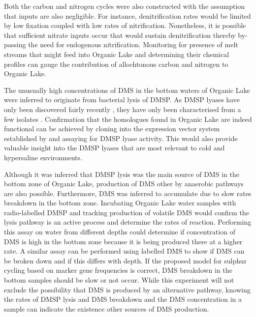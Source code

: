 Both the carbon and nitrogen cycles were also constructed with the assumption that inputs are also negligible.
For instance, denitrification rates would be limited by low fixation coupled with low rates of nitrification.
Nonetheless, it is possible that sufficient nitrate inputs occur that would sustain denitrification thereby by-passing the need for endogenous nitrification.
Monitoring for presence of melt streams that might feed into Organic Lake and determining their chemical profiles can gauge the contribution of allochtonous carbon and nitrogen to Organic Lake.

The unusually high concentrations of \ac{DMS} in the bottom waters of Organic Lake were inferred to originate from bacterial lysis of \ac{DMSP}.
As \ac{DMSP} lyases have only been discovered fairly recently \cite{Todd2007, Curson2008}, they have only been characterised from a few isolates \cite{Todd2007, Curson2008, Curson2010, Todd2010, Curson2012}.
Confirmation that the homologues found in Organic Lake are indeed functional can be achieved by cloning into the expression vector system established by \citet{Todd2007} and assaying for \ac{DMSP} lyase activity.
This would also provide valuable insight into the \ac{DMSP} lyases that are most relevant to cold and hypersaline environments.

Although it was inferred that \ac{DMSP} lysis was the main source of \ac{DMS} in the bottom zone of Organic Lake, production of \ac{DMS} other by anaerobic pathways are also possible.
Furthermore, \ac{DMS} was inferred to accumulate due to slow rates breakdown in the bottom zone.
Incubating Organic Lake water samples with radio-labelled \ac{DMSP} and tracking production of volatile \ac{DMS} would confirm the lysis pathway is an active process and determine the rates of reaction.
Performing this assay on water from different depths could determine if concentration of \ac{DMS} is high in the bottom zone because it is being produced there at a higher rate.
A similar assay can be performed using labelled \ac{DMS} to show if \ac{DMS} can be broken down and if this differs with depth.
If the proposed model for sulphur cycling based on marker gene frequencies is correct, \ac{DMS} breakdown in the bottom samples should be slow or not occur.
While this experiment will not exclude the possibility that \ac{DMS} is produced by an alternative pathway, knowing the rates of \ac{DMSP} lysis and \ac{DMS} breakdown and the \ac{DMS} concentration in a sample can indicate the existence other sources of \ac{DMS} production.


